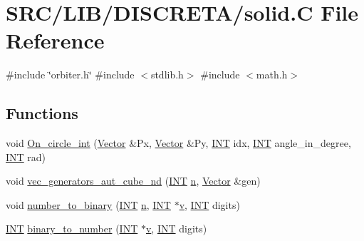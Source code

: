 \hypertarget{solid_8_c}{}\section{S\+R\+C/\+L\+I\+B/\+D\+I\+S\+C\+R\+E\+T\+A/solid.C File Reference}
\label{solid_8_c}
{\ttfamily \#include \char`\"{}orbiter.\+h\char`\"{}}\newline
{\ttfamily \#include $<$stdlib.\+h$>$}\newline
{\ttfamily \#include $<$math.\+h$>$}\newline
\subsection*{Functions}
\begin{DoxyCompactItemize}
\item 
void \mbox{\hyperlink{solid_8_c_a3bb3495d21ca355a81818dd6012881eb}{On\+\_\+circle\+\_\+int}} (\mbox{\hyperlink{class_vector}{Vector}} \&Px, \mbox{\hyperlink{class_vector}{Vector}} \&Py, \mbox{\hyperlink{galois_8h_a09fddde158a3a20bd2dcadb609de11dc}{I\+NT}} idx, \mbox{\hyperlink{galois_8h_a09fddde158a3a20bd2dcadb609de11dc}{I\+NT}} angle\+\_\+in\+\_\+degree, \mbox{\hyperlink{galois_8h_a09fddde158a3a20bd2dcadb609de11dc}{I\+NT}} rad)
\item 
void \mbox{\hyperlink{solid_8_c_a6667c4c5a108f8dff507f759073e6f80}{vec\+\_\+generators\+\_\+aut\+\_\+cube\+\_\+nd}} (\mbox{\hyperlink{galois_8h_a09fddde158a3a20bd2dcadb609de11dc}{I\+NT}} \mbox{\hyperlink{simeon_8_c_a7f2cd26777ce0ff3fdaf8d02aacbddfb}{n}}, \mbox{\hyperlink{class_vector}{Vector}} \&gen)
\item 
void \mbox{\hyperlink{solid_8_c_a1e9e810bb113845942f7f6d2d1cfffda}{number\+\_\+to\+\_\+binary}} (\mbox{\hyperlink{galois_8h_a09fddde158a3a20bd2dcadb609de11dc}{I\+NT}} \mbox{\hyperlink{simeon_8_c_a7f2cd26777ce0ff3fdaf8d02aacbddfb}{n}}, \mbox{\hyperlink{galois_8h_a09fddde158a3a20bd2dcadb609de11dc}{I\+NT}} $\ast$\mbox{\hyperlink{simeon_8_c_aeb3f3030944801b163bc3b829a7f6710}{v}}, \mbox{\hyperlink{galois_8h_a09fddde158a3a20bd2dcadb609de11dc}{I\+NT}} digits)
\item 
\mbox{\hyperlink{galois_8h_a09fddde158a3a20bd2dcadb609de11dc}{I\+NT}} \mbox{\hyperlink{solid_8_c_a5ab5fe856186fefaed59f0cb4067d830}{binary\+\_\+to\+\_\+number}} (\mbox{\hyperlink{galois_8h_a09fddde158a3a20bd2dcadb609de11dc}{I\+NT}} $\ast$\mbox{\hyperlink{simeon_8_c_aeb3f3030944801b163bc3b829a7f6710}{v}}, \mbox{\hyperlink{galois_8h_a09fddde158a3a20bd2dcadb609de11dc}{I\+NT}} digits)
\end{DoxyCompactItemize}


